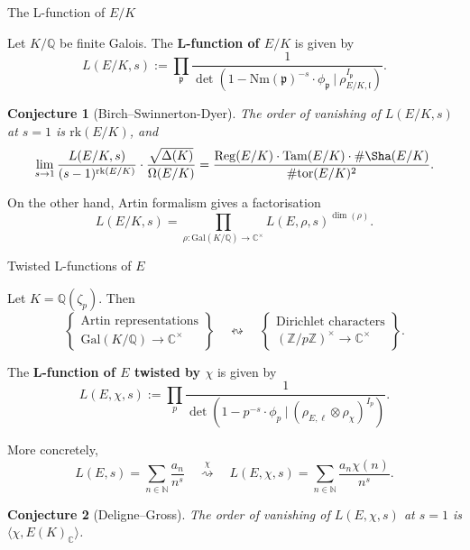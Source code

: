 \documentclass[10pt]{beamer}
\newtheorem{conjecture}{Conjecture}
\begin{document}
\begin{frame}[t]{The L-function of $ E / K $}

Let $ K / \mathbb{Q} $ be finite Galois. The \textbf{L-function of $ E / K $} is given by
$$ L(E / K, s) := \prod_\mathfrak{p} \dfrac{1}{\det(1 - \mathrm{Nm}(\mathfrak{p})^{-s} \cdot \phi_\mathfrak{p} \ | \ \rho_{E / K, \mathfrak{l}}^{I_\mathfrak{p}})}. $$

\pause

\begin{conjecture}[Birch--Swinnerton-Dyer]
The order of vanishing of $ L(E / K, s) $ at $ s = 1 $ is $ \mathrm{rk}(E / K) $, and
$$ \lim_{s \to 1} \dfrac{L(E / K, s)}{(s - 1)^{\mathrm{rk}(E / K)}} \cdot \dfrac{\sqrt{\Delta(K)}}{\Omega(E / K)} = \dfrac{\mathrm{Reg}(E / K) \cdot \mathrm{Tam}(E / K) \cdot \#\Sha(E / K)}{\#\mathrm{tor}(E / K)^2}. $$
\end{conjecture}

\pause

On the other hand, Artin formalism gives a factorisation
$$ L(E / K, s) = \prod_{\rho : \mathrm{Gal}(K / \mathbb{Q}) \to \mathbb{C}^\times} L(E, \rho, s)^{\dim(\rho)}. $$

\end{frame}

\begin{frame}[t]{Twisted L-functions of $ E $}

Let $ K = \mathbb{Q}(\zeta_p) $. Then
$$ \left\{\begin{array}{c} \text{Artin representations} \\ \mathrm{Gal}(K / \mathbb{Q}) \to \mathbb{C}^\times \end{array}\right\} \quad \leftrightsquigarrow \quad \left\{\begin{array}{c} \text{Dirichlet characters} \\ (\mathbb{Z} / p\mathbb{Z})^\times \to \mathbb{C}^\times \end{array}\right\}. $$

\pause

The \textbf{L-function of $ E $ twisted by $ \chi $} is given by
$$ L(E, \chi, s) := \prod_p \dfrac{1}{\det(1 - p^{-s} \cdot \phi_p \ | \ (\rho_{E, \ell} \otimes \rho_\chi)^{I_p})}. $$

\pause

More concretely,
$$ L(E, s) = \sum_{n \in \mathbb{N}} \dfrac{a_n}{n^s} \quad \overset{\chi}{\rightsquigarrow} \quad L(E, \chi, s) = \sum_{n \in \mathbb{N}} \dfrac{a_n\chi(n)}{n^s}. $$

\pause

\begin{conjecture}[Deligne--Gross]
The order of vanishing of $ L(E, \chi, s) $ at $ s = 1 $ is $ \langle\chi, E(K)_\mathbb{C}\rangle $.
\end{conjecture}

\end{frame}
\end{document}
